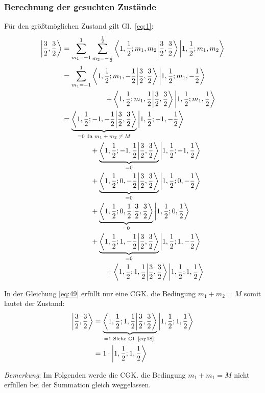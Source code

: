\subsubsection{Berechnung der gesuchten Zustände}
\label{sec:berechn-der-gesucht}

Für den größtmöglichen Zustand gilt Gl.~\eqref{eq:1}:
\begin{align}
  \label{eq:49}
  \ket{\frac 3 2,\frac 3 2} &= \sum_{m_1=-1}^1 \sum_{m_2=-\frac 1 2}^{\frac 1 2}
  \braket{1,\frac 1 2;m_1,m_2}{\frac 3 2,\frac 3 2}\ket{1,\frac 1 2;m_1,m_2}
  \notag\\
  &= \sum_{m_1=-1}^1\braket{1,\frac 1 2;m_1,-\frac 1 2}{\frac 3 2,\frac 3 2}
  \ket{1,\frac 1 2;m_1,-\frac 1 2}\notag\\
  &\qquad\qquad\qquad
  + \braket{1,\frac 1 2;m_1,\frac 1 2}{\frac 3 2,\frac 3 2}
  \ket{1,\frac 1 2;m_1,\frac 1 2}\notag\\
   &= \underbrace{\braket{1,\frac 1 2;-1,-\frac 1 2}{\frac 3 2,\frac 3 2}}
   _{=0 \text{ da \(m_1+m_2\neq M\)}}
  \ket{1,\frac 1 2;-1,-\frac 1 2}\notag\\
  &\qquad\qquad
  + \underbrace{\braket{1,\frac 1 2;-1,\frac 1 2}{\frac 3 2,\frac 3 2}}_{=0}
  \ket{1,\frac 1 2;-1,\frac 1 2}\notag\\
   &\qquad\qquad
  +\underbrace{\braket{1,\frac 1 2;0,-\frac 1 2}{\frac 3 2,\frac 3 2}}_{=0}
  \ket{1,\frac 1 2;0,-\frac 1 2}\notag\\
  &\qquad\qquad
  + \underbrace{\braket{1,\frac 1 2;0,\frac 1 2}{\frac 3 2,\frac 3 2}}_{=0}
  \ket{1,\frac 1 2;0,\frac 1 2}\notag\\
  &\qquad\qquad
  +\underbrace{\braket{1,\frac 1 2;1,-\frac 1 2}{\frac 3 2,\frac 3 2}}_{=0}
  \ket{1,\frac 1 2;1,-\frac 1 2}\notag\\
  &\qquad\qquad\qquad
  + \braket{1,\frac 1 2;1,\frac 1 2}{\frac 3 2,\frac 3 2}
  \ket{1,\frac 1 2;1,\frac 1 2}
\end{align}

In der Gleichung \eqref{eq:49} erfüllt nur eine CGK. die Bedingung \(m_1+m_2=M\)
somit lautet der Zustand:
\begin{align}
  \label{eq:50}
  \ket{\frac 3 2,\frac 3 2} &= \underbrace{
    \braket{1,\frac 1 2;1,\frac 1 2}{\frac 3 2,\frac 3 2}}
  _{=1 \text{ Siehe Gl.~\eqref{eq:18} }}
  \ket{1,\frac 1 2;1,\frac 1 2}\notag\\
  &=1\cdot\ket{1,\frac 1 2;1,\frac 1 2}
\end{align}

\emph{Bemerkung}: Im Folgenden werde die CGK. die Bedingung \(m_1+m_1=M\) nicht erfüllen
bei der Summation gleich weggelassen.

